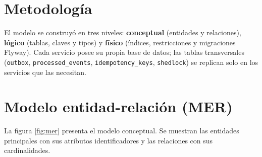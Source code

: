 \documentclass[10pt,letterpaper,twocolumn,oneside]{report}
\newcommand{\pkg}[1]{\texttt{#1}}
\begin{document}
\section{Metodología}

El modelo se construyó en tres niveles: \textbf{conceptual} (entidades y relaciones),
\textbf{lógico} (tablas, claves y tipos) y \textbf{físico} (índices, restricciones y
migraciones Flyway). Cada servicio posee su propia base de datos; las tablas transversales
(\pkg{outbox}, \pkg{processed\_events}, \pkg{idempotency\_keys}, \pkg{shedlock}) se replican
solo en los servicios que las necesitan.

\section{Modelo entidad-relación (MER)}

La figura \ref{fig:mer} presenta el modelo conceptual. Se muestran las entidades principales con
sus atributos identificadores y las relaciones con sus cardinalidades.
\end{document}
